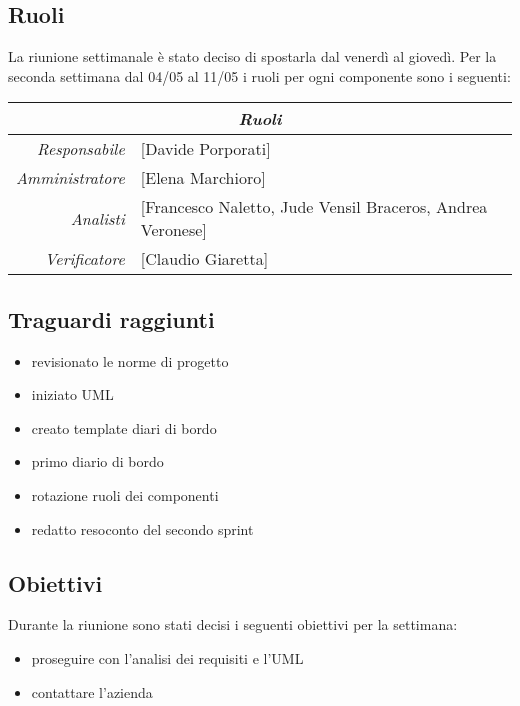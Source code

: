 \documentclass[12pt]{article}
\begin{document}
\subsection{Ruoli}
La riunione settimanale è stato deciso di spostarla dal venerdì al giovedì.
Per la seconda settimana dal 04/05 al 11/05 i ruoli per ogni componente sono i seguenti:
\\
\begin{tabular}{r | l}
    \multicolumn{2}{c}{\textit{Ruoli}}\\
    \hline
        \textit{Responsabile} &
        [Davide Porporati]\makecell{}\\
        \textit{Amministratore} &
        [Elena Marchioro]\makecell{}\\
        \textit{Analisti} &
        [Francesco Naletto, Jude Vensil Braceros, Andrea Veronese]\makecell{}\\
        \textit{Verificatore} & 
        [Claudio Giaretta]\makecell{}\\
\end{tabular}

\subsection{Traguardi raggiunti}
\begin{itemize}
    \item revisionato le norme di progetto
    \item iniziato UML
    \item creato template diari di bordo
    \item primo diario di bordo
    \item rotazione ruoli dei componenti
    \item redatto resoconto del secondo sprint
\end{itemize}

\subsection{Obiettivi}
Durante la riunione sono stati decisi i seguenti obiettivi per la settimana:
\begin{itemize}
    \item proseguire con l'analisi dei requisiti e l'UML
    \item contattare l'azienda
\end{itemize}
\end{document}
